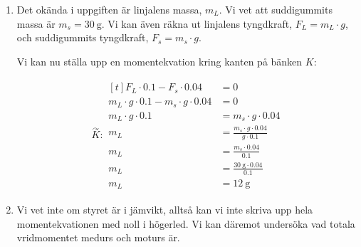 \documentclass[11pt]{article}
\begin{document}
\begin{enumerate}[itemsep=2em]
              \begin{center}
                      
              \end{center}
              \newpage
        \item
              Det okända i uppgiften är linjalens massa, $m_L$. Vi vet att suddigummits massa är $m_s = \SI{30}{\gram}$. Vi kan även räkna ut linjalens tyngdkraft, $F_L = m_L \cdot g$, och suddigummits tyngdkraft, $F_s = m_s \cdot g$.

              Vi kan nu ställa upp en momentekvation kring kanten på bänken $K$:

              \begin{align*}
                      \overset{\curvearrowright}{K} : \begin{aligned}[t]
                                                              F_L \cdot 0.1 - F_s \cdot 0.04                 & = 0                                          \\
                                                              m_L \cdot g \cdot 0.1 - m_s \cdot g \cdot 0.04 & = 0                                          \\
                                                              m_L \cdot g \cdot 0.1                          & = m_s \cdot g \cdot 0.04                     \\
                                                              m_L                                            & = \frac{m_s \cdot g \cdot 0.04}{g \cdot 0.1} \\
                                                              m_L                                            & = \frac{m_s \cdot 0.04}{0.1}                 \\
                                                              m_L                                            & = \frac{\SI{30}{\gram} \cdot 0.04}{0.1}      \\
                                                              m_L                                            & = \SI{12}{\gram}
                                                      \end{aligned}
              \end{align*}
              \begin{center}
                      
              \end{center}

        \item
              Vi vet inte om styret är i jämvikt, alltså kan vi inte skriva upp hela momentekvationen med noll i högerled. Vi kan däremot undersöka vad totala vridmomentet medurs och moturs är.


\end{enumerate}
\end{document}
